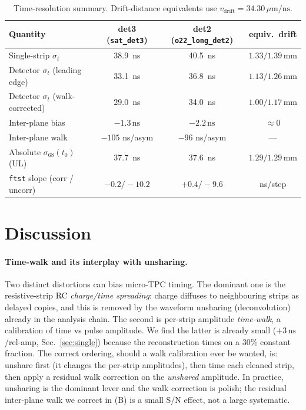 \documentclass[11pt]{article}
\newcommand{\ns}{\,\mathrm{ns}}
\newcommand{\dmm}{\,\mathrm{mm}}
\newcommand{\vdr}{$v_\mathrm{drift}=34.30\,\mu\mathrm{m/ns}$}
\begin{document}
\begin{table}[h]
  \centering
  \caption{Time-resolution summary. Drift-distance equivalents use
  \vdr.}
  \label{tab:results}
  \begin{tabular}{lccc}
    \toprule
    Quantity & det3 (\texttt{sat\_det3}) & det2 (\texttt{o22\_long\_det2}) & equiv.\ drift \\
    \midrule
    Single-strip $\sigma_t$              & \SI{38.9}{ns} & \SI{40.5}{ns} & $1.33/1.39\dmm$ \\
    Detector $\sigma_t$ (leading edge)   & \SI{33.1}{ns} & \SI{36.8}{ns} & $1.13/1.26\dmm$ \\
    Detector $\sigma_t$ (walk-corrected) & \SI{29.0}{ns} & \SI{34.0}{ns} & $1.00/1.17\dmm$ \\
    Inter-plane bias                     & $-1.3\ns$     & $-2.2\ns$     & $\approx 0$ \\
    Inter-plane walk                     & $-105$ ns/asym & $-96$ ns/asym & --- \\
    Absolute $\sigma_{68}(t_0)$ (UL)     & \SI{37.7}{ns} & \SI{37.6}{ns} & $1.29/1.29\dmm$ \\
    \texttt{ftst} slope (corr / uncorr)  & $-0.2/-10.2$  & $+0.4/-9.6$   & ns/step \\
    \bottomrule
  \end{tabular}
\end{table}

\section{Discussion}
\paragraph{Time-walk and its interplay with unsharing.}
Two distinct distortions can bias micro-TPC timing. The dominant one is the
resistive-strip RC \emph{charge/time spreading}: charge diffuses to neighbouring
strips as delayed copies, and this is removed by the waveform unsharing
(deconvolution) already in the analysis chain. The second is per-strip amplitude
\emph{time-walk}, a calibration of time vs pulse amplitude. We find the latter is
already small ($+3\ns$/rel-amp, Sec.~\ref{sec:single}) because the reconstruction
times on a $30\%$ constant fraction. The correct ordering, should a walk
calibration ever be wanted, is: unshare first (it changes the per-strip
amplitudes), then time each cleaned strip, then apply a residual walk correction on
the \emph{unshared} amplitude. In practice, unsharing is the dominant lever and the
walk correction is polish; the residual inter-plane walk we correct in (B) is a
small S/N effect, not a large systematic.
\end{document}
